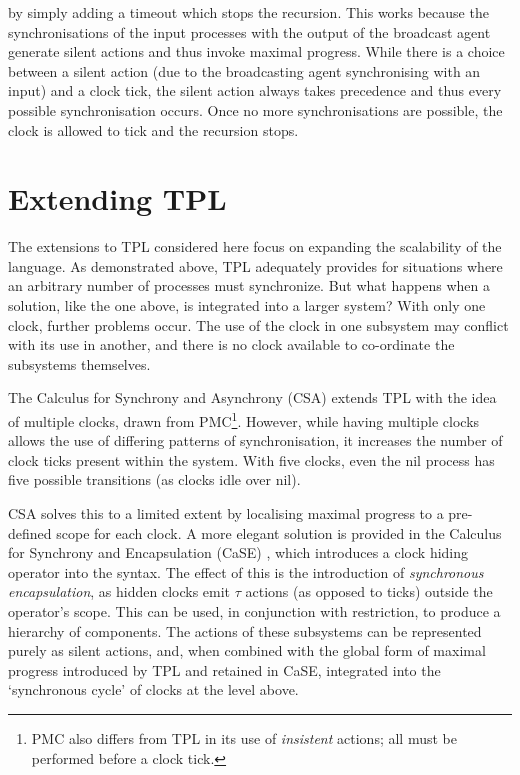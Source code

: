 \noindent by simply adding a timeout which stops the recursion.  This
works because the synchronisations of the input processes with the
output of the broadcast agent generate silent actions and thus invoke
maximal progress.  While there is a choice between a silent action
(due to the broadcasting agent synchronising with an input) and a
clock tick, the silent action always takes precedence and thus every
possible synchronisation occurs.  Once no more synchronisations are
possible, the clock is allowed to tick and the recursion stops.

\section{Extending TPL}
\label{tplext}

The extensions to TPL considered here focus on expanding the
scalability of the language.  As demonstrated above, TPL adequately
provides for situations where an arbitrary number of processes must
synchronize.  But what happens when a solution, like the one above, is
integrated into a larger system?  With only one clock, further
problems occur.  The use of the clock in one subsystem may conflict
with its use in another, and there is no clock available to
co-ordinate the subsystems themselves.

The Calculus for Synchrony and Asynchrony (CSA) \cite*{csa} extends TPL
with the idea of multiple clocks, drawn from PMC\footnote{PMC also
  differs from TPL in its use of \emph{insistent} actions; all must be
  performed before a clock tick.}\cite*{pmc}. However, while having
multiple clocks allows the use of differing patterns of
synchronisation, it increases the number of clock ticks present within
the system.  With five clocks, even the nil process has five possible
transitions (as clocks idle over nil).

CSA solves this to a limited extent by localising maximal progress to
a pre-defined scope for each clock.  A more elegant solution is
provided in the Calculus for Synchrony and Encapsulation (CaSE)
\cite*{CaSE}, which introduces a clock hiding operator into the syntax.
The effect of this is the introduction of \emph{synchronous
  encapsulation}, as hidden clocks emit $\tau$ actions (as opposed to
ticks) outside the operator's scope.  This can be used, in conjunction
with restriction, to produce a hierarchy of components.  The actions
of these subsystems can be represented purely as silent actions, and,
when combined with the global form of maximal progress introduced by
TPL and retained in CaSE, integrated into the `synchronous cycle'
\cite{CaSE} of clocks at the level above.


